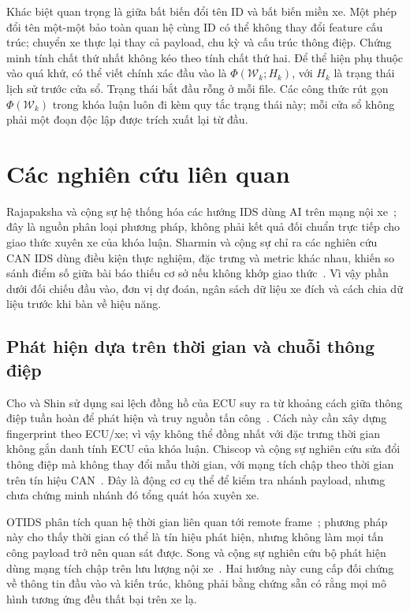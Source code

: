 \documentclass[12pt,a4paper,oneside,openany]{extbook}
\begin{document}
Khác biệt quan trọng là giữa bất biến đổi tên ID và bất biến miền xe. Một phép đổi tên một-một bảo toàn quan hệ cùng ID có thể không thay đổi feature cấu trúc; chuyển xe thực lại thay cả payload, chu kỳ và cấu trúc thông điệp. Chứng minh tính chất thứ nhất không kéo theo tính chất thứ hai.
Để thể hiện phụ thuộc vào quá khứ, có thể viết chính xác đầu vào là $\Phi(\mathcal W_k;H_k)$, với $H_k$ là trạng thái lịch sử trước cửa sổ. Trạng thái bắt đầu rỗng ở mỗi file. Các công thức rút gọn $\Phi(\mathcal W_k)$ trong khóa luận luôn đi kèm quy tắc trạng thái này; mỗi cửa sổ không phải một đoạn độc lập được trích xuất lại từ đầu.


\chapter{Các nghiên cứu liên quan}\label{chap:related}
Rajapaksha và cộng sự hệ thống hóa các hướng IDS dùng AI trên mạng nội xe~\cite{rajapaksha2023survey}; đây là nguồn phân loại phương pháp, không phải kết quả đối chuẩn trực tiếp cho giao thức xuyên xe của khóa luận. Sharmin và cộng sự chỉ ra các nghiên cứu CAN IDS dùng điều kiện thực nghiệm, đặc trưng và metric khác nhau, khiến so sánh điểm số giữa bài báo thiếu cơ sở nếu không khớp giao thức~\cite{sharmin2024benchmark}. Vì vậy phần dưới đối chiếu đầu vào, đơn vị dự đoán, ngân sách dữ liệu xe đích và cách chia dữ liệu trước khi bàn về hiệu năng.

\section{Phát hiện dựa trên thời gian và chuỗi thông điệp}
Cho và Shin sử dụng sai lệch đồng hồ của ECU suy ra từ khoảng cách giữa thông điệp tuần hoàn để phát hiện và truy nguồn tấn công~\cite{cho2016fingerprint}. Cách này cần xây dựng fingerprint theo ECU/xe; vì vậy không thể đồng nhất với đặc trưng thời gian không gắn danh tính ECU của khóa luận. Chiscop và cộng sự nghiên cứu sửa đổi thông điệp mà không thay đổi mẫu thời gian, với mạng tích chập theo thời gian trên tín hiệu CAN~\cite{chiscop2021modification}. Đây là động cơ cụ thể để kiểm tra nhánh payload, nhưng chưa chứng minh nhánh đó tổng quát hóa xuyên xe.

OTIDS phân tích quan hệ thời gian liên quan tới remote frame~\cite{lee2017otids}; phương pháp này cho thấy thời gian có thể là tín hiệu phát hiện, nhưng không làm mọi tấn công payload trở nên quan sát được. Song và cộng sự nghiên cứu bộ phát hiện dùng mạng tích chập trên lưu lượng nội xe~\cite{song2020dcnn}. Hai hướng này cung cấp đối chứng về thông tin đầu vào và kiến trúc, không phải bằng chứng sẵn có rằng mọi mô hình tương ứng đều thất bại trên xe lạ.
\end{document}
